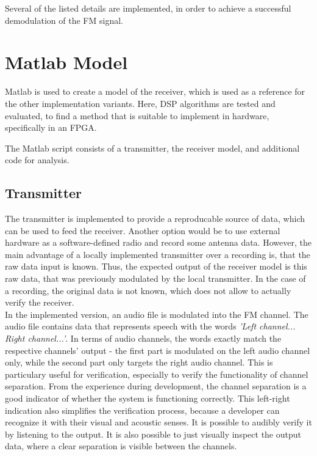 \noindent
Several of the listed details are implemented, in order to achieve a successful demodulation of the FM signal.

\section{Matlab Model}

Matlab is used to create a model of the receiver, which is used as a reference for the other implementation variants.
Here, DSP algorithms are tested and evaluated, to find a method that is suitable to implement in hardware, specifically in an FPGA.

The Matlab script consists of a transmitter, the receiver model, and additional code for analysis.

\subsection{Transmitter}

The transmitter is implemented to provide a reproducable source of data, which can be used to feed the receiver.
Another option would be to use external hardware as a software-defined radio and record some antenna data.
However, the main advantage of a locally implemented transmitter over a recording is, that the raw data input is known.
Thus, the expected output of the receiver model is this raw data, that was previously modulated by the local transmitter.
In the case of a recording, the original data is not known, which does not allow to actually verify the receiver.\\

In the implemented version, an audio file is modulated into the FM channel.
The audio file contains data that represents speech with the words \textit{'Left channel... Right channel...'}.
In terms of audio channels, the words exactly match the respective channels' output - the first part is modulated on the left audio channel only, while the second part only targets the right audio channel.
This is particulary useful for verification, especially to verify the functionality of channel separation.
From the experience during development, the channel separation is a good indicator of whether the system is functioning correctly.
This left-right indication also simplifies the verification process, because a developer can recognize it with their visual and acoustic senses.
It is possible to audibly verify it by listening to the output.
It is also possible to just visually inspect the output data, where a clear separation is visible between the channels.\\

